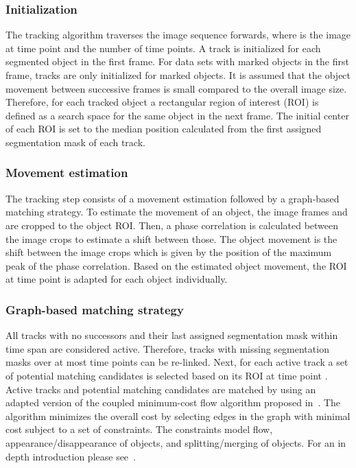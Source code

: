 \documentclass[10pt,letterpaper]{article}
\begin{document}
\subsubsection*{Initialization} 
The tracking algorithm traverses the image sequence  forwards, where  is the image at time point  and  the number of time points. A track is initialized for each segmented object in the first frame. For data sets with marked objects in the first frame, tracks are only initialized for marked objects. It is assumed that the object movement between successive frames is small compared to the overall image size. Therefore, for each tracked object a rectangular region of interest (ROI) is defined as a search space for the same object in the next frame. The initial center of each ROI is set to the median position calculated from the first assigned segmentation mask of each track.

\subsubsection*{Movement estimation} The tracking step consists of a movement estimation followed by a graph-based matching strategy. To estimate the movement of an object, the image frames  and   are cropped to the object ROI. Then, a phase correlation \cite{Kuglin1975} is calculated between the image crops to estimate a shift between those. The object movement is the shift between the image crops which is given by the position of the maximum peak of the phase correlation. Based on the estimated object movement, the ROI at time point   is adapted for each object individually.

\subsubsection*{Graph-based matching strategy}
All tracks with no successors and their last assigned segmentation mask within time span  are considered active. Therefore, tracks with missing segmentation masks over at most  time points can be re-linked. Next, for each active track a set of potential matching candidates is selected based on its ROI at time point . Active tracks and potential matching candidates are matched by using an adapted version of the coupled minimum-cost flow algorithm proposed in~\cite{Padfield2011}. The algorithm minimizes the overall cost by selecting edges in the graph with minimal cost subject to a set of constraints. The constraints model flow, appearance/disappearance of objects, and splitting/merging of objects. For an in depth introduction please see~\cite{Padfield2011}.
\end{document}
